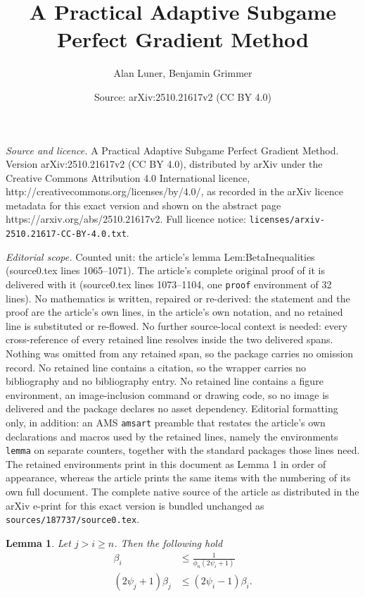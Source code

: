 \documentclass[10pt,a4paper]{amsart}
\title{A Practical Adaptive Subgame Perfect Gradient Method}
\author{Alan Luner, Benjamin Grimmer}
\date{Source: arXiv:2510.21617v2 (CC BY 4.0)}
\newtheorem{lemma}{Lemma}
\begin{document}
\maketitle

\noindent\emph{Source and licence.} A Practical Adaptive Subgame Perfect Gradient Method. Version arXiv:2510.21617v2 (CC BY 4.0), distributed by arXiv under the Creative Commons Attribution 4.0 International licence, http://creativecommons.org/licenses/by/4.0/, as recorded in the arXiv licence metadata for this exact version and shown on the abstract page https://arxiv.org/abs/2510.21617v2. Full licence notice: \texttt{licenses/arxiv-2510.21617-CC-BY-4.0.txt}.\par\smallskip

\noindent\textit{Editorial scope.} Counted unit: the article's lemma Lem:BetaInequalities (source0.tex lines 1065--1071). The article's complete original proof of it is delivered with it (source0.tex lines 1073--1104, one \texttt{proof} environment of 32 lines). No mathematics is written, repaired or re-derived: the statement and the proof are the article's own lines, in the article's own notation, and no retained line is substituted or re-flowed.  No further source-local context is needed: every cross-reference of every retained line resolves inside the two delivered spans.  Nothing was omitted from any retained span, so the package carries no omission record.  No retained line contains a citation, so the wrapper carries no bibliography and no bibliography entry.  No retained line contains a figure environment, an image-inclusion command or drawing code, so no image is delivered and the package declares no asset dependency.  Editorial formatting only, in addition: an AMS \texttt{amsart} preamble that restates the article's own declarations and macros used by the retained lines, namely the environments \texttt{lemma} on separate counters, together with the standard packages those lines need.  The retained environments print in this document as Lemma 1 in order of appearance, whereas the article prints the same items with the numbering of its own full document.  The complete native source of the article as distributed in the arXiv e-print for this exact version is bundled unchanged as \texttt{sources/187737/source0.tex}.
\begin{lemma} \label{Lem:BetaInequalities}
    Let $j > i \geq n$. Then the following hold
    \begin{align}
        \beta_i &\leq \frac{1}{\phi_n (2\psi_i + 1)} \label{Eqn:BetaLemma1} \\
        (2\psi_j + 1) \beta_j & \leq (2 \psi_i - 1) \beta_i. \label{Eqn:BetaLemma2}
    \end{align}
\end{lemma}
\end{document}
